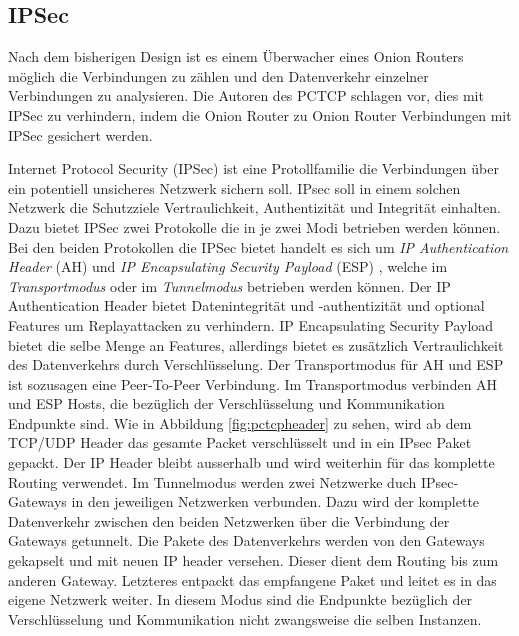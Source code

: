 \documentclass[fleqn,envcountsame,runningheads,10pt,a4paper]{llncs}
\begin{document}
\subsection{IPSec}

Nach dem bisherigen Design ist es einem Überwacher eines Onion Routers möglich die Verbindungen zu zählen und den Datenverkehr einzelner Verbindungen zu analysieren. Die Autoren des PCTCP schlagen vor, dies mit IPSec zu verhindern, indem die Onion Router zu Onion Router Verbindungen mit IPSec gesichert werden. 

Internet Protocol Security (IPSec) ist eine Protollfamilie die Verbindungen über ein potentiell unsicheres Netzwerk sichern soll. IPsec soll in einem solchen Netzwerk die Schutzziele Vertraulichkeit, Authentizität und Integrität einhalten. Dazu bietet IPSec zwei Protokolle die in je zwei Modi betrieben werden können. Bei den beiden Protokollen die IPSec bietet handelt es sich um \textit{IP Authentication Header} (AH) \cite{rfc:ah} und \textit{IP Encapsulating Security Payload} (ESP) \cite{rfc:esp}, welche im \textit{Transportmodus} oder im \textit{Tunnelmodus} betrieben werden können. Der IP Authentication Header bietet Datenintegrität und -authentizität und optional Features um Replayattacken zu verhindern. IP Encapsulating Security Payload bietet die selbe Menge an Features, allerdings bietet es zusätzlich Vertraulichkeit des Datenverkehrs durch Verschlüsselung. Der Transportmodus für AH und ESP ist sozusagen eine Peer-To-Peer Verbindung. Im Transportmodus verbinden AH und ESP Hosts, die bezüglich der Verschlüsselung und Kommunikation Endpunkte sind. Wie in Abbildung \ref{fig:pctcpheader} zu sehen, wird ab dem TCP/UDP Header das gesamte Packet verschlüsselt und in ein IPsec Paket gepackt. Der IP Header bleibt ausserhalb und wird weiterhin für das komplette Routing verwendet. Im Tunnelmodus werden zwei Netzwerke duch IPsec-Gateways in den jeweiligen Netzwerken verbunden. Dazu wird der komplette Datenverkehr zwischen den beiden Netzwerken über die Verbindung der Gateways getunnelt. Die Pakete des Datenverkehrs werden von den Gateways gekapselt und mit neuen IP header versehen. Dieser dient dem Routing bis zum anderen Gateway. Letzteres entpackt das empfangene Paket und leitet es in das eigene Netzwerk weiter. In diesem Modus sind die Endpunkte bezüglich der Verschlüsselung und Kommunikation nicht zwangsweise die selben Instanzen.
\end{document}
